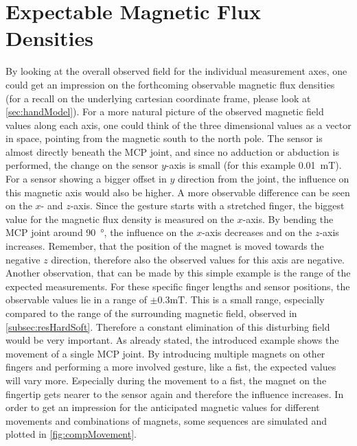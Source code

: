 


\section{Expectable Magnetic Flux Densities}

By looking at the overall observed field for the individual measurement axes, one could get an impression on the forthcoming observable magnetic flux densities (for a recall on the underlying cartesian coordinate frame, please look at \ref{sec:handModel}). For a more natural picture of the observed magnetic field values along each axis, one could think of the three dimensional values as a vector in space, pointing from the magnetic south to the north pole. The sensor is almost directly beneath the \ac{MCP} joint, and since no adduction or abduction is performed, the change on the sensor $ y $-axis is small (for this example \SI{0.01}{\milli \tesla}). For a sensor showing a bigger offset in $ y $ direction from the joint, the influence on this magnetic axis would also be higher. A more observable difference can be seen on the $ x $- and $ z $-axis. Since the gesture starts with a stretched finger, the biggest value for the magnetic flux density is measured on the $ x $-axis. By bending the \ac{MCP} joint around \SI{90}{\degree}, the influence on the $ x $-axis decreases and on the $ z $-axis increases. Remember, that the position of the magnet is moved towards the negative $ z $ direction, therefore also the observed values for this axis are negative. Another observation, that can be made by this simple example is the range of the expected measurements. For these specific finger lengths and sensor positions, the observable values lie in a range of $ \pm 0.3\si{\milli \tesla} $. This is a small range, especially compared to the range of the surrounding magnetic field, observed in \ref{subsec:resHardSoft}. Therefore a constant elimination of this disturbing field would be very important. As already stated, the introduced example shows the movement of a single \ac{MCP} joint. By introducing multiple magnets on other fingers and performing a more involved gesture, like a fist, the expected values will vary more. Especially during the movement to a fist, the magnet on the fingertip gets nearer to the sensor again and therefore the influence increases. In order to get an impression for the anticipated magnetic values for different movements and combinations of magnets, some sequences are simulated and plotted in \ref{fig:compMovement}.\\
